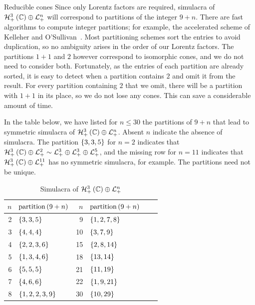 \documentclass{interact}
\theoremstyle{plain}
\theoremstyle{definition}
\theoremstyle{remark}
\begin{document}
\begin{section}{Reducible cones}
    Since only Lorentz factors are required, simulacra of
    $\directsum{\Hnplus[3]\of{\Cn[1]}}{\Lnplus}$ will correspond to
    partitions of the integer $9+n$. There are fast algorithms to
    compute integer partitions; for example, the accelerated scheme of
    Kelleher and O'Sullivan~\cite{kelleher-osullivan}. Most
    partitioning schemes sort the entries to avoid duplication, so no
    ambiguity arises in the order of our Lorentz factors. The
    partitions $1 + 1$ and $2$ however correspond to isomorphic cones,
    and we do not need to consider both. Fortunately, as the entries
    of each partition are already sorted, it is easy to detect when a
    partition contains $2$ and omit it from the result. For every
    partition containing $2$ that we omit, there will be a partition
    with $1+1$ in its place, so we do not lose any cones. This can
    save a considerable amount of time.

    In the table below, we have listed for $n \le 30$ the partitions
    of $9 + n$ that lead to symmetric simulacra of
    $\directsum{\Hnplus[3]\of{\Cn[1]}}{\Lnplus}$. Absent $n$ indicate
    the absence of simulacra. The partition $\left\lbrace{3,3,5}\right\rbrace$ for $n=2$
    indicates that $\directsum{\Hnplus[3]\of{\Cn[1]}}{\Lnplus[2]} \sim
    \directsumthree{\Lnplus[3]}{\Lnplus[3]}{\Lnplus[5]}$, and the
    missing row for $n=11$ indicates that
    $\directsum{\Hnplus[3]\of{\Cn[1]}}{\Lnplus[11]}$ has no symmetric
    simulacra, for example. The partitions need not be unique.
    \begin{table}[H]
      \begin{center}
        \begin{tabular}{rl  rl  rl}
          $n$ & $\operatorname{partition}\left({9+n}\right)$
          & $n$ & $\operatorname{partition}\left({9+n}\right)$\\
          \midrule
          2  & $\left\lbrace{3,3,5}\right\rbrace$ &
          9  & $\left\lbrace{1,2,7,8}\right\rbrace$\\
          3  & $\left\lbrace{4,4,4}\right\rbrace$ &
          10 & $\left\lbrace{3,7,9}\right\rbrace$\\
          4  & $\left\lbrace{2,2,3,6}\right\rbrace$ &
          15 & $\left\lbrace{2,8,14}\right\rbrace$\\
          5  & $\left\lbrace{1,3,4,6}\right\rbrace$ &
          18 & $\left\lbrace{13,14}\right\rbrace$\\
          6  & $\left\lbrace{5,5,5}\right\rbrace$ &
          21 & $\left\lbrace{11,19}\right\rbrace$\\
          7  & $\left\lbrace{4,6,6}\right\rbrace$ &
          22 & $\left\lbrace{1,9,21}\right\rbrace$\\
          8  & $\left\lbrace{1,2,2,3,9}\right\rbrace$ &
          30 & $\left\lbrace{10,29}\right\rbrace$
        \end{tabular}
        \caption{Simulacra of $\directsum{\Hnplus[3]\of{\Cn[1]}}{\Lnplus}$}
      \end{center}
    \end{table}


\end{section}
\end{document}

